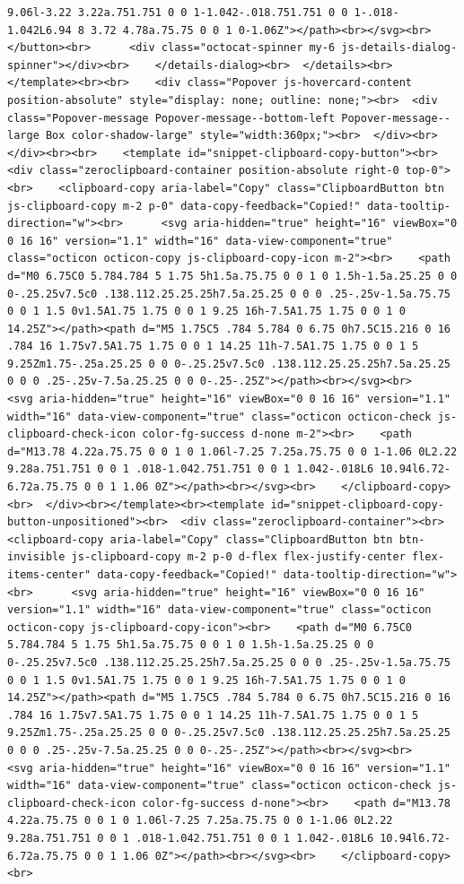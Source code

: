 \documentclass[
  letterpaper,
]{book}
\begin{document}
\begin{verbatim}
9.06l-3.22 3.22a.751.751 0 0 1-1.042-.018.751.751 0 0 1-.018-1.042L6.94 8 3.72 4.78a.75.75 0 0 1 0-1.06Z"></path><br></svg><br>      </button><br>      <div class="octocat-spinner my-6 js-details-dialog-spinner"></div><br>    </details-dialog><br>  </details><br></template><br><br>    <div class="Popover js-hovercard-content position-absolute" style="display: none; outline: none;"><br>  <div class="Popover-message Popover-message--bottom-left Popover-message--large Box color-shadow-large" style="width:360px;"><br>  </div><br></div><br><br>    <template id="snippet-clipboard-copy-button"><br>  <div class="zeroclipboard-container position-absolute right-0 top-0"><br>    <clipboard-copy aria-label="Copy" class="ClipboardButton btn js-clipboard-copy m-2 p-0" data-copy-feedback="Copied!" data-tooltip-direction="w"><br>      <svg aria-hidden="true" height="16" viewBox="0 0 16 16" version="1.1" width="16" data-view-component="true" class="octicon octicon-copy js-clipboard-copy-icon m-2"><br>    <path d="M0 6.75C0 5.784.784 5 1.75 5h1.5a.75.75 0 0 1 0 1.5h-1.5a.25.25 0 0 0-.25.25v7.5c0 .138.112.25.25.25h7.5a.25.25 0 0 0 .25-.25v-1.5a.75.75 0 0 1 1.5 0v1.5A1.75 1.75 0 0 1 9.25 16h-7.5A1.75 1.75 0 0 1 0 14.25Z"></path><path d="M5 1.75C5 .784 5.784 0 6.75 0h7.5C15.216 0 16 .784 16 1.75v7.5A1.75 1.75 0 0 1 14.25 11h-7.5A1.75 1.75 0 0 1 5 9.25Zm1.75-.25a.25.25 0 0 0-.25.25v7.5c0 .138.112.25.25.25h7.5a.25.25 0 0 0 .25-.25v-7.5a.25.25 0 0 0-.25-.25Z"></path><br></svg><br>      <svg aria-hidden="true" height="16" viewBox="0 0 16 16" version="1.1" width="16" data-view-component="true" class="octicon octicon-check js-clipboard-check-icon color-fg-success d-none m-2"><br>    <path d="M13.78 4.22a.75.75 0 0 1 0 1.06l-7.25 7.25a.75.75 0 0 1-1.06 0L2.22 9.28a.751.751 0 0 1 .018-1.042.751.751 0 0 1 1.042-.018L6 10.94l6.72-6.72a.75.75 0 0 1 1.06 0Z"></path><br></svg><br>    </clipboard-copy><br>  </div><br></template><br><template id="snippet-clipboard-copy-button-unpositioned"><br>  <div class="zeroclipboard-container"><br>    <clipboard-copy aria-label="Copy" class="ClipboardButton btn btn-invisible js-clipboard-copy m-2 p-0 d-flex flex-justify-center flex-items-center" data-copy-feedback="Copied!" data-tooltip-direction="w"><br>      <svg aria-hidden="true" height="16" viewBox="0 0 16 16" version="1.1" width="16" data-view-component="true" class="octicon octicon-copy js-clipboard-copy-icon"><br>    <path d="M0 6.75C0 5.784.784 5 1.75 5h1.5a.75.75 0 0 1 0 1.5h-1.5a.25.25 0 0 0-.25.25v7.5c0 .138.112.25.25.25h7.5a.25.25 0 0 0 .25-.25v-1.5a.75.75 0 0 1 1.5 0v1.5A1.75 1.75 0 0 1 9.25 16h-7.5A1.75 1.75 0 0 1 0 14.25Z"></path><path d="M5 1.75C5 .784 5.784 0 6.75 0h7.5C15.216 0 16 .784 16 1.75v7.5A1.75 1.75 0 0 1 14.25 11h-7.5A1.75 1.75 0 0 1 5 9.25Zm1.75-.25a.25.25 0 0 0-.25.25v7.5c0 .138.112.25.25.25h7.5a.25.25 0 0 0 .25-.25v-7.5a.25.25 0 0 0-.25-.25Z"></path><br></svg><br>      <svg aria-hidden="true" height="16" viewBox="0 0 16 16" version="1.1" width="16" data-view-component="true" class="octicon octicon-check js-clipboard-check-icon color-fg-success d-none"><br>    <path d="M13.78 4.22a.75.75 0 0 1 0 1.06l-7.25 7.25a.75.75 0 0 1-1.06 0L2.22 9.28a.751.751 0 0 1 .018-1.042.751.751 0 0 1 1.042-.018L6 10.94l6.72-6.72a.75.75 0 0 1 1.06 0Z"></path><br></svg><br>    </clipboard-copy><br> 
\end{verbatim}
\end{document}
